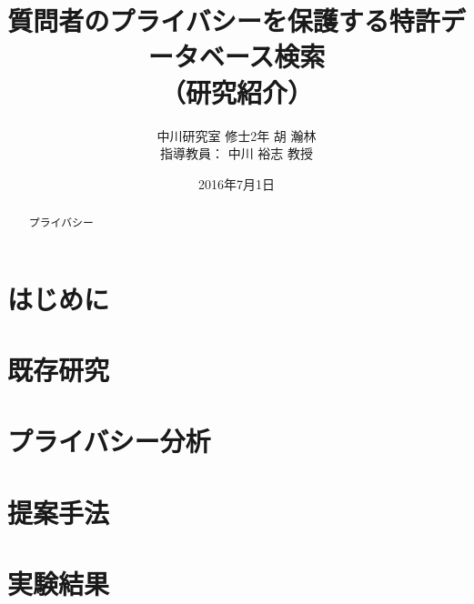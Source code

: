\documentclass{jarticle}
\title{質問者のプライバシーを保護する特許データベース検索 \\（研究紹介）}
\author{中川研究室 修士2年 胡 瀚林\\指導教員： 中川 裕志 教授}
\date{2016年7月1日}
\theoremstyle{definition}
\begin{document}
\maketitle
\begin{abstract}
プライバシー
\end{abstract}

\section{はじめに}
\section{既存研究}
\section{プライバシー分析}
\section{提案手法}
\section{実験結果}

\end{document}
